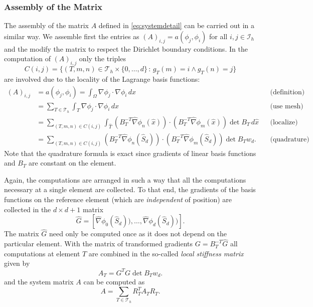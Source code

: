 \documentclass[a4paper,12pt]{article}
\begin{document}
\subsubsection*{Assembly of the Matrix}

The assembly of the matrix $A$ defined in \eqref{eq:systemdetail} can be carried
out in a similar way. We assemble first the entries as $(A)_{i,j}=a(\phi_j,\phi_i)$
for all $i,j\in\mathcal{I}_h$ and the modify the matrix to respect the Dirichlet
boundary conditions. In the computation of $(A)_{i,j}$ only the triples
$$C(i,j) = \{(T,m,n)\in\mathcal{T}_h\times\{0,\ldots,d\} \,:\, g_T(m)=i \wedge g_T(n)=j\}$$
are involved due to the locality of the Lagrange basis functions:
\begin{align*}
(A)_{i,j} &= a(\phi_j,\phi_i) = \int_\Omega \nabla \phi_j \cdot \nabla \phi_i \,dx 
&&\text{(definition)}\\
&= \sum_{T\in\mathcal{T}_h} \int_T \nabla \phi_j \cdot \nabla \phi_i \,dx
&&\text{(use mesh)}\\
&= \sum_{(T,m,n)\in C(i,j)}
\int_{\hat T} (B_T^{-T} \hat\nabla\phi_n(\hat x))\cdot (B_T^{-T} \hat\nabla\phi_m(\hat x))
\det B_T \,d\hat x &&\text{(localize)}\\
&= \sum_{(T,m,n)\in C(i,j)}
(B_T^{-T} \hat\nabla\phi_n(\hat S_d))\cdot (B_T^{-T} \hat\nabla\phi_m(\hat S_d))
\det B_T w_d . &&\text{(quadrature)}
\end{align*}
Note that the quadrature formula is exact since gradients of linear basis functions
and $B_T$ are constant on the element.

Again, the computations are arranged in such a way that all the computations
necessary at a single element are collected. To that end,
the gradients of the basis functions on the reference element (which are {\em independent}
of position) are collected in the $d\times d+1$ matrix
\begin{equation*}
\hat G = \left[\hat\nabla\phi_0(\hat S_d)),\ldots,\hat\nabla\phi_d(\hat S_d))\right] .
\end{equation*}
The matrix $\hat G$ need only be computed once as it does not depend on the
particular element.
With the matrix of transformed gradients $G=B_T^{-T} \hat G$
all computations at element $T$ are 
combined in the so-called {\em local stiffness matrix} given by
\begin{equation}
A_T = G^T G \det B_T w_d .
\label{eq:jacobian_volume}
\end{equation}
and the system matrix $A$ can be computed as
\begin{equation}
A =  \sum_{T\in\mathcal{T}_h} R_T^T A_T R_T .
\label{eq:matrixassembly}
\end{equation}
\end{document}
